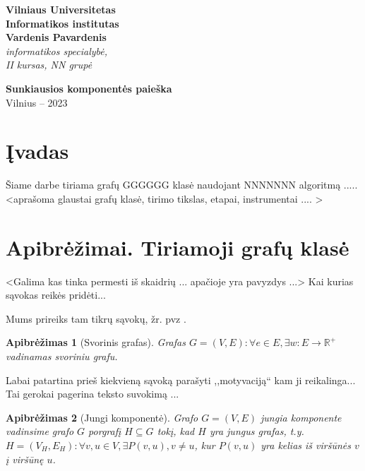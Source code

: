 \documentclass[bibliography=totoc]{article}
\newtheorem{definition}{Apibrėžimas}
\begin{document}
\begin{titlepage}
    \begin{center}
        \vspace*{1cm}
 
        \Huge
        \textbf{Vilniaus Universitetas}\\
         \textbf{Informatikos institutas}\\
        
        \vspace{6.5cm}
        \textbf{Vardenis Pavardenis}\\
       \textit{ informatikos specialybė, \\
                 II kursas, NN grupė\\}
        
        \textbf{Sunkiausios komponentės paieška}\\
          
                 
 
        \vfill
        Vilnius -- 2023
    \end{center}
\end{titlepage}
\tableofcontents
\newpage
\section*{Įvadas}
\label{sec:ivadas}
Šiame darbe tiriama grafų GGGGGG klasė naudojant  NNNNNNN algoritmą .....
<aprašoma glaustai grafų klasė, tirimo tikslas, etapai, instrumentai ....  >

\newpage
\section{Apibrėžimai. Tiriamoji grafų klasė}
<Galima kas tinka permesti iš skaidrių ... apačioje yra pavyzdys ...>
Kai kurias sąvokas reikės pridėti...

Mums prireiks tam tikrų  sąvokų, žr. pvz \citep{Graf}. 
\begin{definition}[Svorinis grafas]\citep{Graf}
Grafas $G=(V,E):\forall e\in E, \exists w:E\to \mathbb{R}^{+}$ vadinamas svoriniu grafu.
\end{definition}

Labai patartina prieš kiekvieną sąvoką parašyti ,,motyvaciją`` kam ji reikalinga... Tai gerokai pagerina teksto suvokimą ...

\begin{definition}[Jungi komponentė]\citep{Graf}
Grafo $G=(V,E)$ jungia komponente vadinsime grafo $G$ porgrafį $H\subseteq G$ tokį, kad $H$ yra jungus grafas, t.y.
$H=(V_H, E_H): \forall v,u\in V, \exists P(v,u), v\neq u$, kur $P(v,u)$ yra kelias iš viršūnės $v$ į viršūnę $u$.
\end{definition}
\end{document}

